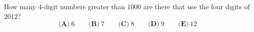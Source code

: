 How many $4$-digit numbers greater than $1000$ are there that use the four digits of $2012$?
\[\textbf{(A)}\ 6\qquad\textbf{(B)}\ 7\qquad\textbf{(C)}\ 8\qquad\textbf{(D)}\ 9\qquad\textbf{(E)}\ 12\]

